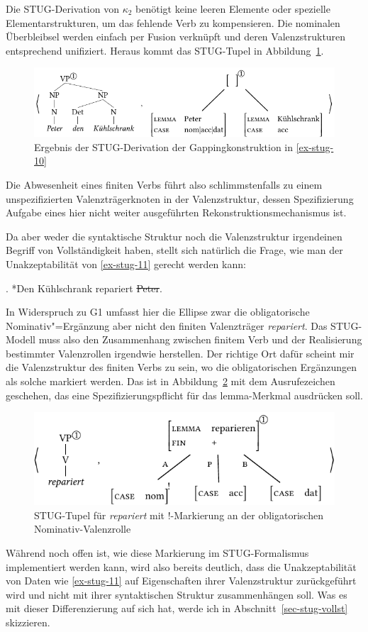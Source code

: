 Die STUG-Derivation von $\kappa_2$ benötigt keine leeren Elemente oder spezielle Elementarstrukturen, um das fehlende Verb zu kompensieren. Die nominalen Überbleibsel werden einfach per Fusion verknüpft und deren Valenzstrukturen entsprechend unifiziert. Heraus kommt das STUG-Tupel in Abbildung~\ref{fig-stug-14}. 
\begin{figure}[t]
\centering
\includegraphics{graphics/abb914.pdf}
\caption{\label{fig-stug-14} Ergebnis der STUG-Derivation der Gappingkonstruktion in \ref{ex-stug-10}}
\end{figure}
Die Abwesenheit eines finiten Verbs führt also schlimmstenfalls zu einem unspezifizierten Valenzträgerknoten in der Valenzstruktur, dessen Spezifizierung Aufgabe eines hier nicht weiter ausgeführten Rekonstruktionsmechanismus ist. 

Da aber weder die syntaktische Struktur noch die Valenzstruktur irgendeinen Begriff von Vollständigkeit haben, stellt sich natürlich die Frage, wie man der Unakzeptabilität von \ref{ex-stug-11} gerecht werden kann:

\ex. \label{ex-stug-11} *Den Kühlschrank repariert \sout{Peter}.

In Widerspruch zu G1 umfasst hier die Ellipse zwar die obligatorische Nominativ"=Ergänzung aber nicht den finiten Valenzträger {\it repariert}. Das STUG-Modell muss also den Zusammenhang zwischen finitem Verb und der Realisierung bestimmter Valenzrollen irgendwie herstellen. Der richtige Ort dafür scheint mir die Valenzstruktur des finiten Verbs zu sein, wo die obligatorischen Ergänzungen als solche markiert werden. Das ist in Abbildung~\ref{fig-stug-15} mit dem Ausrufezeichen geschehen, das eine Spezifizierungspflicht für das {\sc lemma}-Merkmal ausdrücken soll.
\begin{figure}[t]
\centering
\includegraphics{graphics/abb915.pdf}
\caption{\label{fig-stug-15}STUG-Tupel für {\it repariert} mit !-Markierung an der obligatorischen Nominativ-Valenzrolle}
\end{figure}
Während noch offen ist, wie diese Markierung im STUG-Formalismus implementiert werden kann, wird also bereits deutlich, dass die Unakzeptabilität von Daten wie \ref{ex-stug-11} auf Eigenschaften ihrer Valenzstruktur zurückgeführt wird und nicht mit ihrer syntaktischen Struktur zusammenhängen soll. Was es mit dieser Differenzierung auf sich hat, werde ich in Abschnitt~\ref{sec-stug-vollst} skizzieren. 


